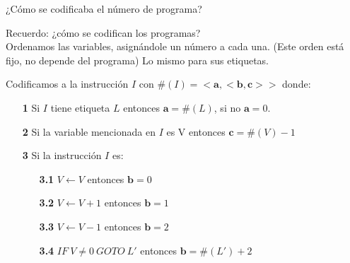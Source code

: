 \documentclass[10pt]{beamer}
\begin{document}

\begin{frame}{¿Cómo se codificaba el número de programa?}

	

	Recuerdo: ¿cómo se codifican los programas? \\ \pause
	Ordenamos las variables, asignándole un número a cada una. (Este orden está fijo, no depende del programa)
	Lo mismo para sus etiquetas. \pause
	
	
	
	
	Codificamos a la instrucción $I$ con $\#(I)=<\textbf{a},<\textbf{b},\textbf{c}>>$ donde:

	\begin{itemize}
		\item[\textbf{1}]Si $I$ tiene etiqueta $L$ entonces $\textbf{a}= \#(L)$, si no $\textbf{a}=0$.
	\item[\textbf{2}] Si la variable mencionada en $I$ es V entonces $\textbf{c} = \#(V)-1$  %
	\item[\textbf{3}] Si la instrucción $I$ es:
	\begin{itemize}
		\item[\textbf{3.1}] $V \leftarrow V$ entonces $\textbf{b}=0$
		\item[\textbf{3.2}] $V \leftarrow V+1$ entonces $\textbf{b}=1$
		\item[\textbf{3.3}] $V \leftarrow V-1$ entonces $\textbf{b}=2$
		\item[\textbf{3.4}] $IF\ V \neq 0\ GOTO\ L'$  entonces $\textbf{b}=\#(L')+2$  %
	\end{itemize}
	\end{itemize}
	

\end{frame}
\end{document}
